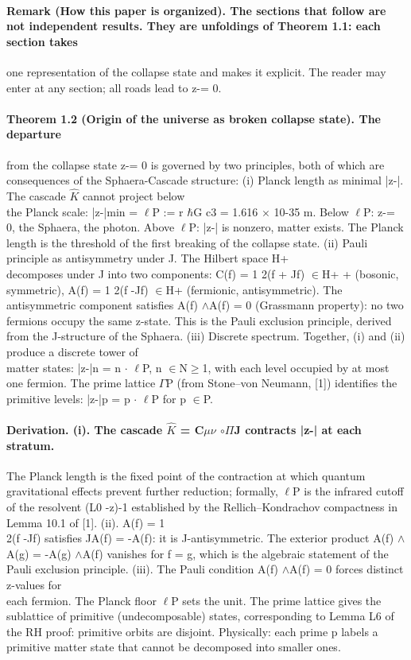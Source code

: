 \documentclass[12pt,a4paper]{article}
\begin{document}
\paragraph*{Remark (How this paper is organized). The sections that follow are not independent results. They are unfoldings of Theorem 1.1: each section takes}
one representation of the collapse state and makes it explicit. The reader may enter at any section; all roads lead to z-= 0.
\paragraph*{Theorem 1.2 (Origin of the universe as broken collapse state). The departure}
from the collapse state z-= 0 is governed by two principles, both of which are consequences of the Sphaera-Cascade structure:
(i) Planck length as minimal |z-|. The cascade $\hat K$ cannot project below\\
the Planck scale: |z-|min = $\ell$P := r $\hbar$G c3 = 1.616 $\times$ 10-35 m. Below $\ell$P: z-= 0, the Sphaera, the photon. Above $\ell$P: |z-| is nonzero, matter exists. The Planck length is the threshold of the first breaking of the collapse state.
(ii) Pauli principle as antisymmetry under J. The Hilbert space H+\\
decomposes under J into two components: C(f) = 1 2(f + Jf) $\in$H+ + (bosonic, symmetric), A(f) = 1 2(f -Jf) $\in$H+ (fermionic, antisymmetric). The antisymmetric component satisfies A(f) $\wedge$A(f) = 0 (Grassmann property): no two fermions occupy the same z-state. This is the Pauli exclusion principle, derived from the J-structure of the Sphaera.
(iii) Discrete spectrum. Together, (i) and (ii) produce a discrete tower of\\
matter states: |z-|n = n $\cdot$ $\ell$P, n $\in$N$\geq$1, with each level occupied by at most one fermion. The prime lattice $\Gamma$P (from Stone--von Neumann, [1]) identifies the primitive levels: |z-|p = p $\cdot$ $\ell$P for p $\in$P.
\paragraph*{Derivation. (i). The cascade $\hat K$ = C$\mu$$\nu$ $\circ$$\Pi$J contracts |z-| at each stratum.}
The Planck length is the fixed point of the contraction at which quantum gravitational effects prevent further reduction; formally, $\ell$P is the infrared cutoff of the resolvent (L0 -z)-1 established by the Rellich--Kondrachov compactness in Lemma 10.1 of [1].
(ii). A(f) = 1\\
2(f -Jf) satisfies JA(f) = -A(f): it is J-antisymmetric. The exterior product A(f) $\wedge$A(g) = -A(g) $\wedge$A(f) vanishes for f = g, which is the algebraic statement of the Pauli exclusion principle.
(iii). The Pauli condition A(f) $\wedge$A(f) = 0 forces distinct z-values for\\
each fermion. The Planck floor $\ell$P sets the unit. The prime lattice gives the sublattice of primitive (undecomposable) states, corresponding to Lemma L6
of the RH proof: primitive orbits are disjoint. Physically: each prime p labels a primitive matter state that cannot be decomposed into smaller ones.
\end{document}
